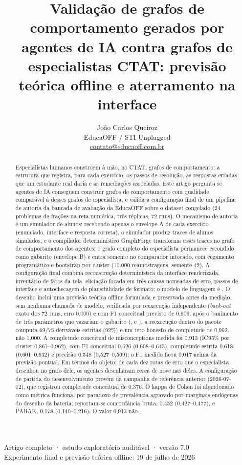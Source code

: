 \documentclass[11pt,a4paper]{article}
\title{\bfseries Validação de grafos de comportamento gerados por agentes de IA contra grafos de especialistas CTAT: previsão teórica offline e aterramento na interface}
\author{João Carlos Queiroz\\\small EducaOFF / STI Unplugged\\\small \href{mailto:contato@educaoff.com.br}{contato@educaoff.com.br}}
\date{}
\begin{document}
\maketitle
\vspace{-1.8em}
\begin{center}
\small Artigo completo · estudo exploratório auditável · versão 7.0\\
\footnotesize Experimento final e previsão teórica offline: 19 de julho de 2026
\end{center}
\vspace{0.5em}

\begin{abstract}
Especialistas humanos constroem à mão, no CTAT, grafos de comportamento: a estrutura que registra, para cada exercício, os passos de resolução, as respostas erradas que um estudante real daria e as remediações associadas. Este artigo pergunta se agentes de IA conseguem construir grafos de comportamento com qualidade comparável à desses grafos de especialista, e valida a configuração final de um pipeline de autoria da bancada de avaliação da EducaOFF sobre o dataset congelado  (24 problemas de frações na reta numérica, três réplicas, 72 runs). O mecanismo de autoria é um simulador de alunos: recebendo apenas o envelope A de cada exercício (enunciado, interface e resposta correta), o simulador produz traces de alunos simulados, e o compilador determinístico GraphForge transforma esses traces no grafo de comportamento dos agentes; o grafo completo do especialista permanece escondido como gabarito (envelope B) e entra somente no comparador intocado, com cegamento programático e bootstrap por cluster (10.000 reamostragens, semente 42). A configuração final combina reconstrução determinística da interface renderizada, inventário de fatos da tela, eliciação focada em três causas nomeadas de erro, passos de interface e autochecagem de plausibilidade de formato; o modelo de linguagem é . O desenho inclui uma previsão teórica offline formulada e preservada antes da medição, sem nenhuma chamada de modelo, verificada por reexecução independente (\emph{back-out} exato dos 72 runs, erro 0,000) e com F1 conceitual previsto de 0,609; após o banimento de três parâmetros que vazariam o gabarito (,  e ), a reexecução dentro do pacote computa 69/75 deriváveis estritas (92\%) e um teto honesto de completude de 0,992, não 1,000. A completude conceitual de misconceptions medida foi 0,913 (IC95\% por cluster 0,861--0,962), com F1 conceitual 0,626 (0,608--0,643), completude estrita 0,618 (0,601--0,632) e precisão 0,548 (0,527--0,569); o F1 medido ficou 0,017 acima da previsão pontual. Em termos do objeto: de cada dez rotas de erro que o especialista desenhou no grafo dele, os agentes desenharam cerca de nove nas deles. A configuração de partida do desenvolvimento provém da campanha de referência anterior (2026-07-02), que registrou completude conceitual de 0,376. O kappa de Cohen foi abandonado como métrica funcional por paradoxo de prevalência agravado por marginais endógenas do desenho da bateria; reportam-se concordância bruta, 0,452 (0,427--0,477), e PABAK, 0,178 (0,140--0,216). O valor 0,913 não 
\end{abstract}
\end{document}
